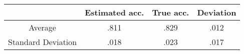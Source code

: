 \begin{tabular}{cccc}
  \toprule
                     & Estimated acc. & True acc. & Deviation \\
  \midrule
  Average            & .811           & .829      & .012      \\
  Standard Deviation & .018           & .023      & .017      \\
  \bottomrule
\end{tabular}
